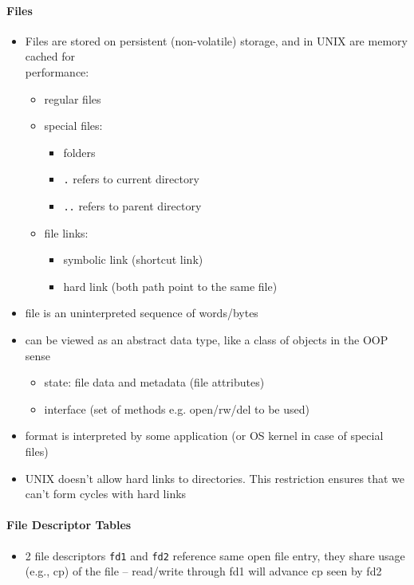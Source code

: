\documentclass[a4paper]{article}
\begin{document}
\paragraph{Files}
\begin{itemize}
	\item Files are stored on persistent (non-volatile) storage, and in UNIX are memory cached for \\performance:
	\begin{itemize}[label=$\circ$]
		\item regular files
		\item special files:
		\begin{itemize}[label=\tiny$\blacksquare$]
			\item folders
			\item \texttt{.} refers to current directory
			\item \texttt{..} refers to parent directory
		\end{itemize}
		\item file links:
		\begin{itemize}[label=\tiny$\blacksquare$]
			\item symbolic link (shortcut link)
			\item hard link (both path point to the same file)
		\end{itemize}
	\end{itemize}
	\item file is an uninterpreted sequence of words/bytes
	\item can be viewed as an abstract data type, like a class of objects in the OOP sense
	\begin{itemize}[label=$\circ$]
		\item state: file data and metadata (file attributes)
		\item interface (set of methods e.g. open/rw/del to be used)
	\end{itemize}
	\item format is interpreted by some application (or OS kernel in case of special files)
	\item UNIX doesn’t allow hard links to directories. This restriction ensures that we can’t form cycles with hard links 
\end{itemize}
\paragraph{File Descriptor Tables}
\begin{itemize}
	\item 2 file descriptors \texttt{fd1} and \texttt{fd2} reference same open file entry, they share usage (e.g., cp) of the file – read/write through fd1 will advance cp seen by fd2
\end{itemize}
\end{document}
